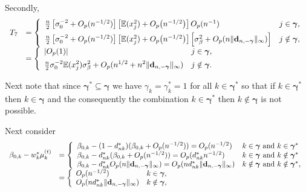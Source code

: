 \documentclass[11pt]{article}
\newtheorem{Main Result}{Main Result}
\def\vectorfontone{\bf}
\def\vectorfonttwo{\boldsymbol}
\def\vd{{\vectorfontone d}}                      %
\def\vgamma{{\vectorfonttwo \gamma}}             %
\def\bE{{\mathbb E}}                             %
\def\ds{\displaystyle}
\begin{document}
{\noindent Secondly,
$$
\begin{array}{rl}
\ds T_7
& \ds = \left\{ \begin{array}{ll}
\tfrac{n}{2}\left[\sigma^{-2}_0 + O_p(n^{-1/2})  \right]
\left[ \bE(x_j^2) + O_p\big(n^{-1/2}\big)\right] O_p(n^{-1})
&  \mbox{$j\in \vgamma$},
\\ [1ex]
\tfrac{n}{2}\left[\sigma^{-2}_0 + O_p(n^{-1/2})  \right]
\left[ \bE(x_j^2) + O_p\big(n^{-1/2}\big)\right]
\left[\sigma_\beta^2 + O_p(n\|\vd_{n,-\vgamma}\|_\infty)\right]
&  \mbox{$j\notin \vgamma$},
\end{array} \right.
\\ [1ex]
& \ds = \left\{ \begin{array}{ll}
\ds |O_p(1)|
&  \mbox{$j\in \vgamma$}, \\ [1ex]
\ds \tfrac{n}{2} \sigma^{-2}_0  \bE(x_j^2)\sigma_\beta^2
+ O_p(n^{1/2} + n^2\|\vd_{n,-\vgamma}\|_\infty)
&  \mbox{$j\notin \vgamma$}.
\end{array} \right.
\end{array}
$$

\noindent Next note that since
$\vgamma^* \subseteq \vgamma$ we have
$\gamma_k=\gamma_k^*=1$ for all $k\in \vgamma^*$ so
that if $k\in \vgamma^*$ then $k\in \vgamma$
and the consequently the combination
$k\in \vgamma^*$ then $k\notin \vgamma$ is
not possible.

Next consider
$$
\begin{array}{rl}
\beta_{0,k} - w_k^{*} \mu_k^{(t)}
& \ds =
\left\{ \begin{array}{ll}
\beta_{0,k} - (1 - d_{nk}^*)(\beta_{0,k} + O_p(n^{-1/2})) = O_p(n^{-1/2})    & \mbox{$k \in \vgamma$ and $k\in\vgamma^*$} \\
\beta_{0,k} - d_{nk}^*(\beta_{0,k} + O_p(n^{-1/2})) = O_p(d_{nk}^*n^{-1/2}) & \mbox{$k \in \vgamma$ and $k\notin\vgamma^*$} \\
\beta_{0,k} - d_{nk}^* O_p(n\|\vd_{n,-\vgamma}\|_\infty) = O_p(nd_{nk}^*\|\vd_{n,-\vgamma}\|_\infty)     & \mbox{$k \notin \vgamma$ and $k\notin\vgamma^*$},
\end{array} \right.  \\
& \ds =
\left\{ \begin{array}{ll}
O_p(n^{-1/2})    & k \in \vgamma, \\
O_p(nd_{nk}^*\|\vd_{n,-\vgamma}\|_\infty)     & k \notin \vgamma,
\end{array} \right. \\
\end{array}
$$

}
\end{document}
